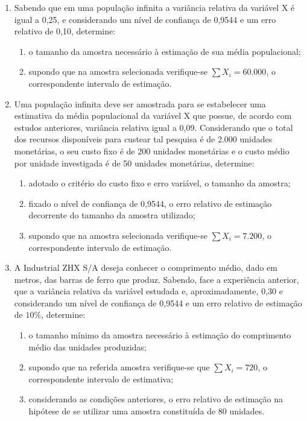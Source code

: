 \begin{enumerate}[resume]
\item Sabendo que em uma população infinita a variância relativa da variável X é igual a 0,25, e considerando um nível de confiança de 0,9544 e um erro relativo de 0,10, determine:
	\begin{enumerate}
	\item o tamanho da amostra necessário à estimação de sua média populacional;
	\item supondo que na amostra selecionada verifique-se $\sum X_{i} =  60.000$, o correspondente intervalo de estimação.	
	\end{enumerate}

\item Uma população infinita deve ser amostrada para se estabelecer uma estimativa da média populacional da variável X que possue, de acordo com estudos anteriores, variância relativa igual a 0,09. Considerando que o total dos recursos disponíveis para custear tal pesquisa é de 2.000 unidades monetárias, o seu custo fixo é de 200 unidades monetárias e o custo médio por unidade investigada é de 50 unidades monetárias, determine:
	\begin{enumerate}
	\item adotado o critério do custo fixo e erro variável, o tamanho da amostra;
	\item fixado o nível de confiança de 0,9544, o erro relativo de estimação decorrente do tamanho da amostra utilizado;	 
	\item supondo que na amostra selecionada verifique-se $\sum X_{i} =  7.200$, o correspondente intervalo de estimação.	
	\end{enumerate}

\item A Industrial ZHX S/A deseja conhecer o comprimento médio, dado em metros, das barras de ferro que produz. Sabendo, face a experiência anterior, que a variância relativa da variável estudada e, aproximadamente, 0,30 e considerando um nível de confiança de 0,9544 e um erro relativo de estimação de $10\%$, determine:
	\begin{enumerate}
	\item o tamanho mínimo da amostra necessário à estimação do comprimento médio das unidades produzidas;
	\item supondo que na referida amostra verifique-se que $\sum X_{i} = 720$, o correspondente intervalo de estimativa;
	\item considerando as condições anteriores, o erro relativo de estimação na hipótese de se utilizar uma amostra constituída de 80 unidades.
	\end{enumerate}
 

\end{enumerate}
